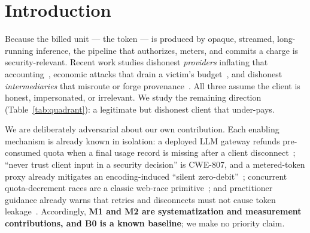 \documentclass[11pt]{article}
\begin{document}
\begin{abstract}
both backends agreed. We also state model-level sufficiency conditions per mechanism,
separating what is sufficient in the model from what is implementation-specific.
Tokenizer cost is real, grows with input length, and varies by $2.9$--$3.6\times$ across
engines; in the tested local SmolLM2-135M CPU configuration the recount accounted for
well under $0.1\%$ of end-to-end inference time ($0.014$--$0.028\%$ across generation
lengths). All reported results regenerate from raw data through fail-closed integrity
gates, and every headline accounting figure has been independently recomputed from raw
data by code that shares nothing with the measurement pipeline.
\end{abstract}

\section{Introduction}
Because the billed unit --- the token --- is produced by opaque, streamed, long-running
inference, the pipeline that authorizes, meters, and commits a charge is
security-relevant. Recent work studies dishonest \emph{providers} inflating that
accounting~\cite{coin,invisible,tokeninflation}, economic attacks that drain a victim's
budget~\cite{dow,llmjacking}, and dishonest \emph{intermediaries} that misroute or forge
provenance~\cite{aex,gwprov}. All three assume the client is honest, impersonated, or
irrelevant. We study the remaining direction (Table~\ref{tab:quadrant}): a legitimate but
dishonest client that under-pays.

We are deliberately adversarial about our own contribution. Each enabling mechanism is
already known in isolation: a deployed LLM gateway refunds pre-consumed quota when a final
usage record is missing after a client disconnect~\cite{newapi5235}; ``never trust client
input in a security decision'' is CWE-807, and a metered-token proxy already mitigates an
encoding-induced ``silent zero-debit''~\cite{aperture247}; concurrent quota-decrement races
are a classic web-race primitive~\cite{kettle}; and practitioner
guidance already warns that retries and disconnects must not cause token
leakage~\cite{practice}. Accordingly, \textbf{M1 and M2 are systematization and
measurement contributions, and B0 is a known baseline}; we make no priority claim.
\end{document}
